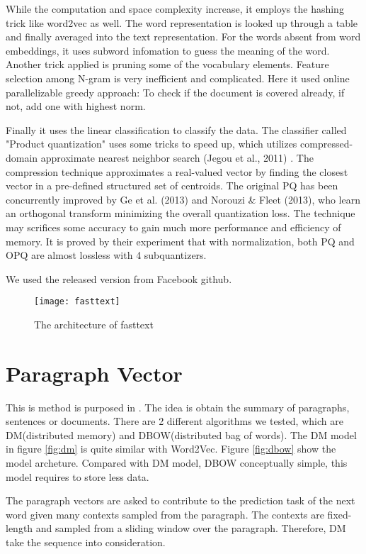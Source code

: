 While the computation and space complexity increase, it employs the hashing trick like word2vec as well. 
The word representation is looked up through a table and finally averaged into the text representation. 
For the words absent from word embeddings, it uses subword infomation\cite{bojanowski2016enriching} to guess the meaning of the word.
Another trick applied is pruning some of the vocabulary elements. Feature selection among N-gram is very inefficient and complicated.
Here it used online parallelizable greedy approach: To check if the document is covered already, if not, add one with highest norm.

Finally it uses the linear classification to classify the data. The classifier called "Product quantization" uses some tricks to speed up, which utilizes compressed-domain approximate nearest neighbor search (Jegou et al., 2011) \cite{jegou2011searching}.
The compression technique approximates a real-valued vector by finding the closest vector in a pre-defined structured set of centroids.
The original PQ has been concurrently improved by Ge et al. (2013)\cite{ge2013optimized} and Norouzi \& Fleet (2013), who learn an orthogonal transform minimizing the overall quantization loss.
The technique may scrifices some accuracy to gain much more performance and efficiency of memory. It is proved by their experiment that with normalization, both PQ and OPQ are almost lossless with 4 subquantizers. 

We used the released version from Facebook github.


\begin{figure}[h]
    \centering
	\texttt{[image: fasttext]}
    \caption{The architecture of fasttext}
    \label{fig:fasttext}
\end{figure}


\section{Paragraph Vector}
	
This is method is purposed in \cite{PVDB}. The idea is obtain the summary of paragraphs, sentences or documents. 
There are 2 different algorithms we tested, which are DM(distributed memory) and DBOW(distributed bag of words). 
The DM model in figure \ref{fig:dm} is quite similar with Word2Vec.
Figure \ref{fig:dbow} show the model archeture. Compared with DM model, DBOW conceptually simple, this model requires to store less data. 

The paragraph vectors are asked to contribute to the prediction task of the next word given many contexts sampled from the paragraph.
The contexts are fixed-length and sampled from a sliding window over the paragraph. Therefore, DM take the sequence into consideration.

